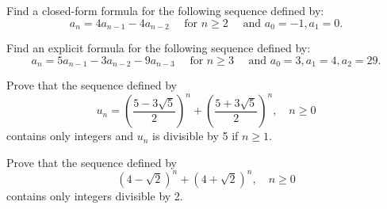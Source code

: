 \begin{exercise}\label{seq-ex-6}
Find a closed-form formula for the following sequence defined by:
$$
a_n=4a_{n-1}-4a_{n-2}\quad\mbox{ for }n\geq 2\quad\mbox{ and }a_0=-1,a_1=0.
$$
\end{exercise}

\begin{exercise}\label{seq-ex-7}
Find an explicit formula for the following sequence defined by:
$$
a_n=5a_{n-1}-3a_{n-2}-9a_{n-3}\quad\mbox{ for }n\geq 3\quad\mbox{ and }a_0=3,a_1=4,a_2=29.
$$
\end{exercise}

\begin{exercise}\label{seq-ex-8}
Prove that the sequence defined by
$$
u_n=\left(\frac{5-3\sqrt{5}}{2}\right)^n+\left(\frac{5+3\sqrt{5}}{2}\right)^n,\quad n\geq 0
$$
contains only integers and $u_n$ is divisible by 5 if $n\geq 1$.
\end{exercise}

\begin{exercise}\label{seq-ex-9}
Prove that the sequence defined by
$$
(4-\sqrt{2})^n+(4+\sqrt{2})^n,\quad n\geq 0
$$
contains only integers divisible by 2.
\end{exercise}

